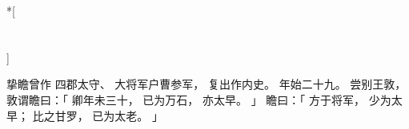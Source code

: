
\switchcolumn[0]*[\section{}]

挚瞻曾作
四郡太守、
大将军户曹参军，
复出作内史。
年始二十九。
尝别王敦，
敦谓瞻曰：「
    卿年未三十，
    已为万石，
    亦太早。
」
瞻曰：「
    方于将军，
    少为太早；
    比之甘罗，
    已为太老。
」

\switchcolumn


